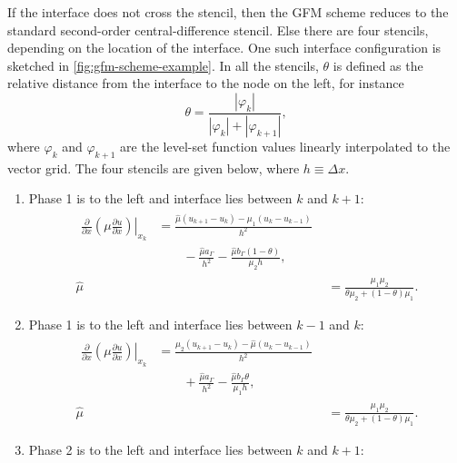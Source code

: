 \documentclass[11pt,b5paper,DIV=calc,BCOR1.3cm,headings=small,%
               footinclude=false,headsepline]{scrbook}
\newcommand*{\pd}[2]{\ensuremath{\frac{\partial #1}{\partial{#2}}}}
\begin{document}
If the interface does not cross the stencil, then the GFM scheme reduces to the
standard second-order central-difference stencil.  Else there are four
stencils, depending on the location of the interface.  One such interface
configuration is sketched in \cref{fig:gfm-scheme-example}.  In all the
stencils, $\theta$ is defined as the relative distance from the interface to
the node on the left, for instance
\begin{equation}
  \theta = \frac{|\varphi_{k}|}{|\varphi_{k}| + |\varphi_{k+1}|},
\end{equation}
where $\varphi_k$ and $\varphi_{k+1}$ are the level-set function values
linearly interpolated to the vector grid.  The four stencils are given below,
where $h\equiv\Delta x$.
\begin{enumerate}
  \item Phase 1 is to the left and interface lies between $k$ and $k+1$:
    \begin{align}
      \begin{split}
        \left.\pd{} x\left(\mu\pd u x\right)\right|_{x_k}
          &= \frac{\hat\mu\left(u_{k+1} - u_{k}\right)
                 - \mu_1\left(u_{k} - u_{k-1}\right)}{h^2} \\
          &\qquad
             - \frac{\hat\mu a_\Gamma}{h^2}
             - \frac{\hat\mu b_\Gamma (1-\theta)}{\mu_2 h},
      \end{split} \\
       \hat\mu &= \frac{\mu_1\mu_2}{\theta\mu_2 + (1-\theta)\mu_1}.
    \end{align}
  \item Phase 1 is to the left and interface lies between $k-1$ and $k$:
    \begin{align}
      \begin{split}
        \left.\pd{} x\left(\mu\pd u x\right)\right|_{x_k}
          &= \frac{\mu_2\left(u_{k+1} - u_{k}\right)
                - \hat\mu\left(u_{k} - u_{k-1}\right)}{h^2} \\
          &\qquad
            + \frac{\hat\mu a_\Gamma}{h^2}
            - \frac{\hat\mu b_\Gamma \theta}{\mu_1 h},
      \end{split} \\
      \hat\mu &= \frac{\mu_1\mu_2}{\theta\mu_2 + (1-\theta)\mu_1}.
    \end{align}
  \item Phase 2 is to the left and interface lies between $k$ and $k+1$:
    \begin{align}
      \begin{split}

\end{split}
\end{align}
\end{enumerate}
\end{document}
